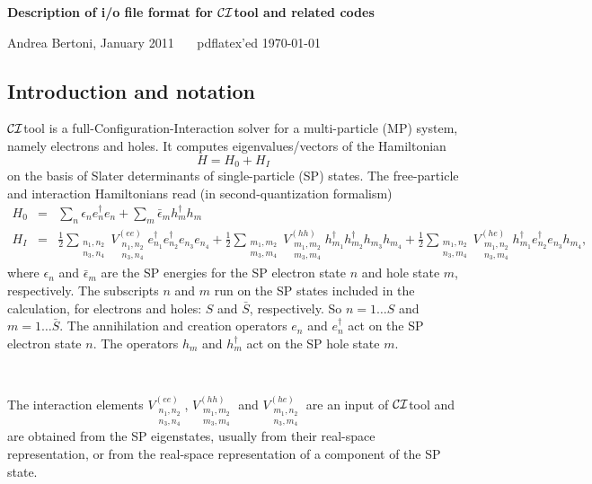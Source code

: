 \documentclass[12pt,twoside]{article}
\author{ANDREA BERTONI}
\newcommand*{\CItool}[0]{{$\cal CI$}\textsf{tool} }
\begin{document}
\centerline{\bf Description of i/o file format for \CItool and related codes}
{\tiny Andrea Bertoni, January 2011 \ \ \  pdflatex'ed \today}

\subsection*{Introduction and notation}

\CItool is a full-Configuration-Interaction solver for a
multi-particle (MP) system, namely electrons and holes.  It computes
eigenvalues/vectors of the Hamiltonian
\begin{equation}
H=H_0+H_I
\end{equation}
on the basis of Slater determinants of single-particle (SP)
states. The free-particle and interaction Hamiltonians read (in
second-quantization formalism)
\begin{eqnarray}
H_0&=&\sum_n \epsilon_n e^\dagger_n e_n + \sum_m \bar\epsilon_m h^\dagger_m h_m
\\ \nonumber
H_I&=&\frac{1}{2}\sum_{\substack{n_1,n_2\\n_3,n_4}} V_{\substack{n_1,n_2\\n_3,n_4}}^{(ee)}
e^\dagger_{n_1} e^\dagger_{n_2} e_{n_3} e_{n_4} +
\frac{1}{2}\sum_{\substack{m_1,m_2\\m_3,m_4}} V_{\substack{m_1,m_2\\m_3,m_4}}^{(hh)}
h^\dagger_{m_1} h^\dagger_{m_2} h_{m_3} h_{m_4} +
\frac{1}{2}\sum_{\substack{m_1,n_2\\n_3,m_4}} V_{\substack{m_1,n_2\\n_3,m_4}}^{(he)}
h^\dagger_{m_1} e^\dagger_{n_2} e_{n_3} h_{m_4} ,
\end{eqnarray}
where $\epsilon_n$ and $\bar\epsilon_m$ are the SP energies for the SP
electron state $n$ and hole state $m$, respectively.  The subscripts
$n$ and $m$ run on the SP states included in the calculation, for
electrons and holes: $S$ and $\bar S$, respectively.  So $n=1\dots S$
and $m=1\dots \bar S$.  The annihilation and creation operators $e_n$
and $e^\dagger_n$ act on the SP electron state $n$. The operators
$h_m$ and $h^\dagger_m$ act on the SP hole state $m$.

\

The interaction elements $V_{\substack{n_1,n_2\\n_3,n_4}}^{(ee)}$,
$V_{\substack{m_1,m_2\\m_3,m_4}}^{(hh)}$ and
$V_{\substack{m_1,n_2\\n_3,m_4}}^{(he)}$ are an input of \CItool and
are obtained from the SP eigenstates, usually from their real-space
representation, or from the real-space representation of a component
of the SP state.
\end{document}

